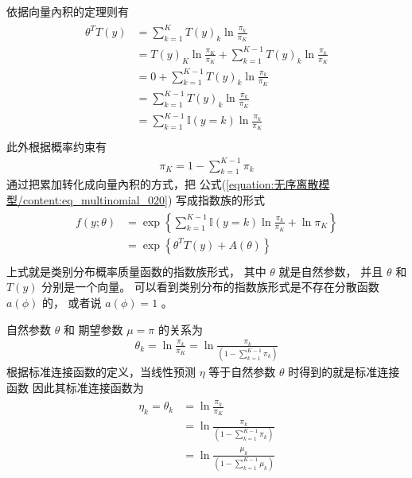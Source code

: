 \documentclass[letterpaper,10pt,english]{sphinxmanual}
\begin{document}
依据向量內积的定理则有
\begin{align}\label{equation:无序离散模型/content:无序离散模型/content:10}\!\begin{aligned}
\theta^T T(y)  &= \sum_{k=1}^{K} T(y)_k  \ln \frac{\pi_k}{\pi_K}\\
&= T(y)_K  \ln \frac{\pi_K}{\pi_K} + \sum_{k=1}^{K-1} T(y)_k  \ln \frac{\pi_k}{\pi_K}\\
&= 0  + \sum_{k=1}^{K-1} T(y)_k  \ln \frac{\pi_k}{\pi_K}\\
&=  \sum_{k=1}^{K-1} T(y)_k  \ln \frac{\pi_k}{\pi_K}\\
&= \sum_{k=1}^{K-1} {\mathbb{I}(y=k)}  \ln \frac{\pi_k}{\pi_K}\\
\end{aligned}\end{align}
此外根据概率约束有
\begin{equation}\label{equation:无序离散模型/content:无序离散模型/content:11}
\begin{split}\pi_K = 1 - \sum_{k=1}^{K-1} \pi_k\end{split}
\end{equation}
通过把累加转化成向量內积的方式，把 公式(\ref{equation:无序离散模型/content:eq_multinomial_020}) 写成指数族的形式
\begin{align}\label{equation:无序离散模型/content:无序离散模型/content:12}\!\begin{aligned}
f(y;\theta)
&= \exp \left \{
\sum_{k=1}^{K-1} {\mathbb{I}(y=k)}  \ln \frac{\pi_k}{ \pi_K}
+ \ln  \pi_K
\right \}\\
&= \exp \left \{
\theta^T T(y)
+ A(\theta)
\right \}\\
\end{aligned}\end{align}
上式就是类别分布概率质量函数的指数族形式，
其中 \(\theta\) 就是自然参数，
并且 \(\theta\) 和 \(T(y)\) 分别是一个向量。
可以看到类别分布的指数族形式是不存在分散函数 \(a(\phi)\) 的，
或者说 \(a(\phi)=1\) 。


自然参数 \(\theta\) 和 期望参数 \(\mu=\pi\) 的关系为
\begin{equation}\label{equation:无序离散模型/content:eq_mg_025}
\begin{split}\theta_k = \ln \frac{ \pi_k}{ \pi_K} = \ln \frac{  \pi_k}{  ( 1 - \sum_{k=1}^{K-1} \pi_k) }\end{split}
\end{equation}
根据标准连接函数的定义，当线性预测 \(\eta\) 等于自然参数 \(\theta\)
时得到的就是标准连接函数
因此其标准连接函数为
\begin{align}\label{equation:无序离散模型/content:eq_mg_030}\!\begin{aligned}
\eta_k = \theta_k &= \ln \frac{\pi_k}{\pi_K}\\
&= \ln \frac{  \pi_k}{  ( 1 - \sum_{k=1}^{K-1} \pi_k) }\\
&= \ln \frac{  \mu_k}{  ( 1 - \sum_{k=1}^{K-1} \mu_k) }\\
\end{aligned}\end{align}
\end{document}
